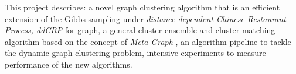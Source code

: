 This project describes: a novel graph clustering algorithm that is an efficient extension of the Gibbs sampling under \emph{distance dependent Chinese Restaurant Process, ddCRP} \cite{blei2011distance} for graph, a general cluster ensemble and cluster matching algorithm based on the concept of \emph{Meta-Graph} \cite{strehl2002cluster}, an algorithm pipeline to tackle the dynamic graph clustering problem, intensive experiments to measure performance of the new algorithms.